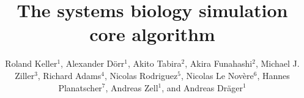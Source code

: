 \documentclass[10pt]{bmc_article}
\newenvironment{bmcformat}{\baselineskip20pt\sloppy\setboolean{publ}{false}}{\baselineskip20pt\sloppy}
\begin{document}
\begin{bmcformat}



\title{The systems biology simulation core algorithm}



\author{%
Roland Keller$^{1}$, %
Alexander D\"orr$^{1}$, %
Akito Tabira$^{2}$, %
Akira Funahashi$^{2}$, %
Michael J. Ziller$^{3}$, %
Richard Adams$^{4}$, %
Nicolas Rodriguez$^{5}$, %
Nicolas Le Nov\`{e}re$^{6}$, %
Hannes Planatscher$^{7}$, %
Andreas Zell$^{1}$, %
and Andreas Dr\"ager$^{1}$\correspondingauthor{}%
}


\address{%
\iid(1)Center for Bioinformatics Tuebingen (ZBIT), University of
Tuebingen, T\"ubingen, Germany
\iid(2)Keio University, Graduate School of
Science and Technology, Yokohama, Japan 
\iid(3)Department of Stem Cell and Regenerative Biology, Harvard University,
Cambridge, MA, USA
\iid(4)SynthSys Edinburgh, CH Waddington Building, University of Edinburgh,
Edinburgh EH9 3JD, UK
\iid(5)European Bioinformatics Institute, Wellcome Trust Genome Campus, Hinxton,
Cambridge, UK
\iid(6)Babraham Institute, Babraham, Cambridge, UK
\iid(7)Natural and Medical Sciences Institute at the University of Tuebingen,
Reutlingen, Germany}


\end{bmcformat}
\end{document}
